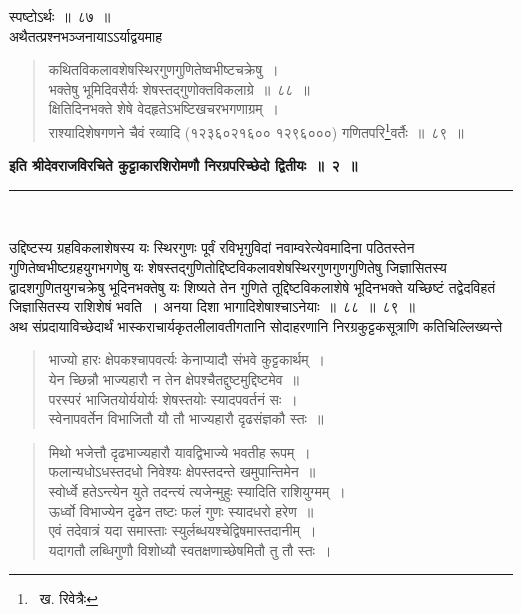 \documentclass[11pt, openany]{book}
\begin{document}
\indent
स्पष्टोऽर्थः~॥~८७~॥\\

\indent
अथैतत्प्रश्नभञ्जनायाऽऽर्याद्वयमाह\textendash

\begin{quote}
{\ks कथितविकलावशेषस्थिरगुणगुणितेष्वभीष्टचक्रेषु~।\\
भक्तेषु भूमिदिवसैर्यः शेषस्तद्गुणोक्तविकलाग्रे~॥~८८~॥\\
क्षितिदिनभक्ते शेषे वेदहृतेऽभष्टिखचरभगणाग्रम्~।\\
राश्यादिशेषगणने चैवं रव्यादि (१२३६०२१६००\textendash
१२९६०००) गणितपरि\renewcommand\thefootnote{३}\footnote{~ख. रिवेत्रैः}वर्तैः~॥~८९~॥}
\end{quote}

\centering
\textbf{इति श्रीदेवराजविरचिते कुट्टाकारशिरोमणौ निरग्रपरिच्छेदो द्वितीयः~॥~२~॥\\}
\rule{0.2\linewidth}{1.0pt}\\

\vspace{1cm}
\justifying

\indent
उद्दिष्टस्य ग्रहविकलाशेषस्य यः स्थिरगुणः पूर्वं रविभृगुविदां नवाम्वरेत्येवमादिना पठितस्तेन गुणितेष्वभीष्टग्रहयुगभगणेषु यः शेषस्तद्गुणितोद्दिष्टविकलावशेषस्थिरगुणगुणगुणितेषु जिज्ञासितस्य द्वादशगुणितयुगचक्रेषु भूदिनभक्तेषु यः शिष्यते तेन गुणिते तूद्दिष्टविकलाशेषे भूदिनभक्ते यच्छिष्टं तद्वेदविहतं जिज्ञासितस्य राशिशेषं भवति~। अनया दिशा भागादिशेषाश्चाऽनेयाः~॥~८८~॥~८९~॥\\

\indent
अथ संप्रदायाविच्छेदार्थं भास्कराचार्यकृतलीलावतीगतानि सोदाहरणानि
निरग्रकुट्टकसूत्राणि कतिचिल्लिख्यन्ते\textendash

\hspace{1cm}
\begin{quote}
{\qt 
भाज्यो हारः क्षेपकश्चापवर्त्यः केनाप्यादौ संभवे कुट्टकार्थम्~।\\
येन च्छिन्नौ भाज्यहारौ न तेन क्षेपश्चैतद्दुष्टमुद्दिष्टमेव~॥\\
परस्परं भाजितयोर्ययोर्यः शेषस्तयोः स्यादपवर्तनं सः~।\\
स्वेनापवर्तेन विभाजितौ यौ तौ भाज्यहारौ दृढसंज्ञकौ स्तः~॥}\\
\end{quote}


\newpage
\thispagestyle{fancy}
\fancyhf{}

\begin{quote}
{\qt 
मिथो भजेत्तौ दृढभाज्यहारौ यावद्विभाज्ये भवतीह रूपम्~।\\
फलान्यधोऽधस्तदधो निवेश्यः क्षेपस्तदन्ते खमुपान्तिमेन~॥\\
स्वोर्ध्वे हतेऽन्त्येन युते तदन्त्यं त्यजेन्मुहुः स्यादिति राशियुग्मम्~।\\
ऊर्ध्वो विभाज्येन दृढेन तष्टः फलं गुणः स्यादधरो हरेण~॥\\
एवं तदेवात्रं यदा समास्ताः स्युर्लब्धयश्चेद्विषमास्तदानीम्~।\\
यदागतौ लब्धिगुणौ विशोध्यौ स्वतक्षणाच्छेषमितौ तु तौ स्तः~।}\\
\end{quote}
\end{document}

